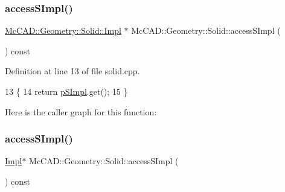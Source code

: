 \mbox{\label{classMcCAD_1_1Geometry_1_1Solid_a41304db7cdf4762342ea833b15764180}} 
\subsubsection{\texorpdfstring{access\+S\+Impl()}{accessSImpl()}\hspace{0.1cm}{\footnotesize\ttfamily [1/2]}}
{\footnotesize\ttfamily \hyperlink{classMcCAD_1_1Geometry_1_1Solid_1_1Impl}{Mc\+C\+A\+D\+::\+Geometry\+::\+Solid\+::\+Impl} $\ast$ Mc\+C\+A\+D\+::\+Geometry\+::\+Solid\+::access\+S\+Impl (\begin{DoxyParamCaption}{ }\end{DoxyParamCaption}) const\hspace{0.3cm}{\ttfamily [inherited]}}



Definition at line 13 of file solid.\+cpp.


\begin{DoxyCode}
13                                      \{
14   \textcolor{keywordflow}{return} \hyperlink{classMcCAD_1_1Geometry_1_1Solid_a77640dab3831396c6527ead13c953614}{pSImpl}.get();
15 \}
\end{DoxyCode}
Here is the caller graph for this function\+:
\mbox{\label{classMcCAD_1_1Geometry_1_1Solid_a1d058cac2d5619e21813a16706dc1826}} 
\subsubsection{\texorpdfstring{access\+S\+Impl()}{accessSImpl()}\hspace{0.1cm}{\footnotesize\ttfamily [2/2]}}
{\footnotesize\ttfamily \hyperlink{classMcCAD_1_1Geometry_1_1CYLSolid_1_1Impl}{Impl}$\ast$ Mc\+C\+A\+D\+::\+Geometry\+::\+Solid\+::access\+S\+Impl (\begin{DoxyParamCaption}{ }\end{DoxyParamCaption}) const\hspace{0.3cm}{\ttfamily [inherited]}}



